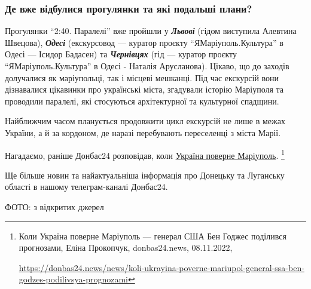 \subsubsection{Де вже відбулися прогулянки та які подальші плани?}

Прогулянки \enquote{2:40. Паралелі} вже пройшли у \emph{\textbf{Львові}} (гідом виступила Алевтина
Швецова), \emph{\textbf{Одесі}} (екскурсовод — куратор проєкту \enquote{ЯМаріуполь.Культура} в Одесі —
Ісидор Бадасен) та \emph{\textbf{Чернівцях}} (гід — куратор проєкту \enquote{ЯМаріуполь.Культура} в
Одесі - Наталія Арусланова). Цікаво, що до заходів долучалися як маріупольці,
так і місцеві мешканці. Під час екскурсій вони дізнавалися цікавинки про
українські міста, згадували історію Маріуполя та проводили паралелі, які
стосуються архітектурної та культурної спадщини.

Найближчим часом планується продовжити цикл екскурсій не лише в межах України,
а й за кордоном, де наразі перебувають переселенці з міста Марії.


Нагадаємо, раніше Донбас24 розповідав, коли \href{https://donbas24.news/news/koli-ukrayina-poverne-mariupol-general-ssa-ben-godzes-podilivsya-prognozami}{Україна поверне Маріуполь}.%
\footnote{Коли Україна поверне Маріуполь — генерал США Бен Годжес поділився прогнозами, Еліна Прокопчук, donbas24.news, 08.11.2022, \par\url{https://donbas24.news/news/koli-ukrayina-poverne-mariupol-general-ssa-ben-godzes-podilivsya-prognozami}}

Ще більше новин та найактуальніша інформація про Донецьку та Луганську області
в нашому телеграм-каналі Донбас24.

ФОТО: з відкритих джерел

